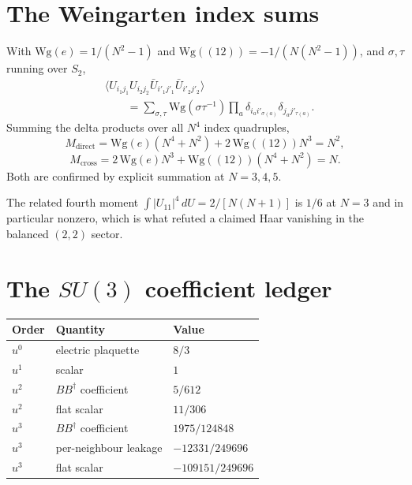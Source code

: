\documentclass[11pt]{article}
\theoremstyle{plain}
\theoremstyle{definition}
\theoremstyle{remark}
\newcommand{\chk}[1]{}
\newcommand{\dg}{^{\dagger}}
\begin{document}
\section{The Weingarten index sums}\label{app:wg}

With $\mathrm{Wg}(e)=1/(N^2-1)$ and $\mathrm{Wg}((12))=-1/(N(N^2-1))$, and
$\sigma,\tau$ running over $S_2$,
\[
  \begin{aligned}
    &\bigl\langle U_{i_1j_1}U_{i_2j_2}
       \bar U_{i'_1j'_1}\bar U_{i'_2j'_2}\bigr\rangle\\
    &\qquad=\sum_{\sigma,\tau}\mathrm{Wg}(\sigma\tau^{-1})
      \prod_a \delta_{i_ai'_{\sigma(a)}}\delta_{j_aj'_{\tau(a)}} .
  \end{aligned}
\]
Summing the delta products over all $N^4$ index quadruples,
\[
  M_{\mathrm{direct}}=\mathrm{Wg}(e)(N^4+N^2)+2\,\mathrm{Wg}((12))N^3=N^2,
\]
\[
  M_{\mathrm{cross}}=2\,\mathrm{Wg}(e)N^3+\mathrm{Wg}((12))(N^4+N^2)=N .
\]
Both are confirmed by explicit summation at $N=3,4,5$.
\chk{the shared-link weights are Weingarten, not an isotropy assumption}
The related fourth moment $\int|U_{11}|^4\,dU=2/[N(N+1)]$ is $1/6$ at $N=3$ and in particular
nonzero, which is what refuted a claimed Haar vanishing in the balanced
$(2,2)$ sector.
\chk{SU(3) Weingarten values follow from the general formula}
\chk{the fourth moment integral |U\_11|\^{}4 = 1/6 at N = 3}

\section{The \texorpdfstring{$SU(3)$}{SU(3)} coefficient ledger}\label{app:ledger}

\begin{center}
\begin{tabular}{@{}lll@{}}
\toprule
Order & Quantity & Value\\
\midrule
$u^0$ & electric plaquette & $8/3$\\
$u^1$ & scalar & $1$\\
$u^2$ & $BB\dg$ coefficient & $5/612$\\
$u^2$ & flat scalar & $11/306$\\
$u^3$ & $BB\dg$ coefficient & $1975/124848$\\
$u^3$ & per-neighbour leakage & $-12331/249696$\\
$u^3$ & flat scalar & $-109151/249696$\\
\bottomrule
\end{tabular}
\end{center}
\chk{the manuscript's SU(3) ledger is this registry, value by value}
\end{document}
